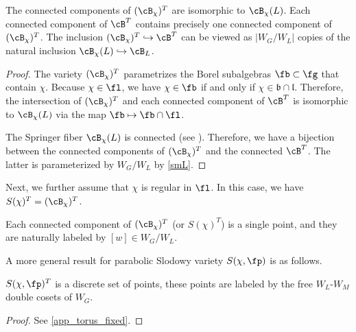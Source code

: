 \documentclass[12pt]{amsart}
\begin{document}
\begin{prop} \label{fixed point Springer fiber}
    The connected components of $(\cB_\chi)^T$ are isomorphic to $\cB_\chi(L)$. Each connected component of $\cB^T$ contains precisely one connected component of $(\cB_\chi)^T$. The inclusion $(\cB_\chi)^T\hookrightarrow \cB^T$ can be viewed as $|W_G/W_L|$ copies of the natural inclusion $\cB_\chi(L)\hookrightarrow\cB_L$.
\end{prop}
\begin{proof}
    The variety $(\cB_\chi)^T$ parametrizes the Borel subalgebras $\fb\subset \fg$ that contain $\chi$. Because $\chi\in \fl$, we have $\chi\in \fb$ if and only if $\chi \in \mathfrak{b} \cap \mathfrak{l}$. Therefore, the intersection of $(\cB_\chi)^T$ and each connected component of $\cB^T$ is isomorphic to $\cB_\chi(L)$ via the map $\fb\mapsto \fb\cap \fl$. 
    
    The Springer fiber $\cB_\chi(L)$ is connected (see \cite{Spaltenstein}). Therefore, we have a bijection between the connected components of $(\cB_\chi)^T$ and the connected $\cB^T$. The latter is parameterized by $W_G/W_L$ by \cref{smL}. %
\end{proof}
Next, we further assume that $\chi$ is regular in $\fl$. In this case, we have $S(\chi)^T= (\cB_\chi)^T$. 
\begin{cor} \label{easy fixed point Springer fiber}
    Each connected component of $(\cB_\chi)^T$ (or $S(\chi)^T$) is a single point, and they are naturally labeled by $[w]\in W_G/W_L$.
\end{cor}

A more general result for parabolic Slodowy variety $S(\chi, \fp)$ is as follows.
\begin{prop} \label{prop fixed point parabolic Slodowy}
    $S(\chi, \fp)^T$ is a discrete set of points, these points are labeled by the free $W_L$-$W_M$ double cosets of $W_G$.
\end{prop}
\begin{proof}
    See \cref{app_torus_fixed}.
\end{proof}







    
    
    
\end{document}
